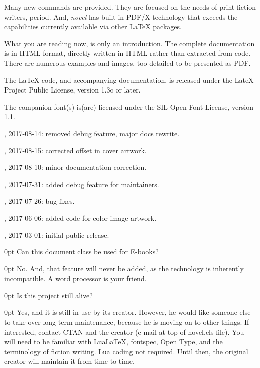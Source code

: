 \documentclass{novel} %
\begin{document}
Many new commands are provided. They are focused on the needs of print fiction writers, period. And, \emph{novel} has built-in PDF/X technology that exceeds the capabilities currently available via other LaTeX packages.


What you are reading now, is only an introduction. The complete documentation is in HTML format, directly written in HTML rather than extracted from code. There are numerous examples and images, too detailed to be presented as PDF.


The LaTeX code, and accompanying documentation, is released under the LateX Project Public License, version 1.3c or later.

The companion font(s) is(are) licensed under the SIL Open Font License, version 1.1.




, 2017-08-14: removed debug feature, major docs rewrite.

, 2017-08-15: corrected offset in cover artwork.

, 2017-08-10: minor documentation correction.

, 2017-07-31: added debug feature for maintainers.

, 2017-07-26: bug fixes.

, 2017-06-06: added code for color image artwork.

, 2017-03-01: initial public release.

\clearpage


\begin{adjustwidth}{\parindent}{0pt}
\backindent{}Can this document class be used for E-books?
\end{adjustwidth}
\begin{adjustwidth}{\parindent}{0pt}
\backindent{}No. And, that feature will never be added, as the technology is inherently incompatible. A word processor is your friend.
\end{adjustwidth}

\begin{adjustwidth}{\parindent}{0pt}
\backindent{}Is this project still alive?
\end{adjustwidth}
\begin{adjustwidth}{\parindent}{0pt}
\backindent{}Yes, and it is still in use by its creator. However, he would like someone else to take over long-term maintenance, because he is moving on to other things. If interested, contact CTAN and the creator (e-mail at top of novel.cls file). You will need to be familiar with LuaLaTeX, fontspec, Open Type, and the terminology of fiction writing. Lua coding not required. Until then, the original creator will maintain it from time to time.
\end{adjustwidth}
\end{document}
